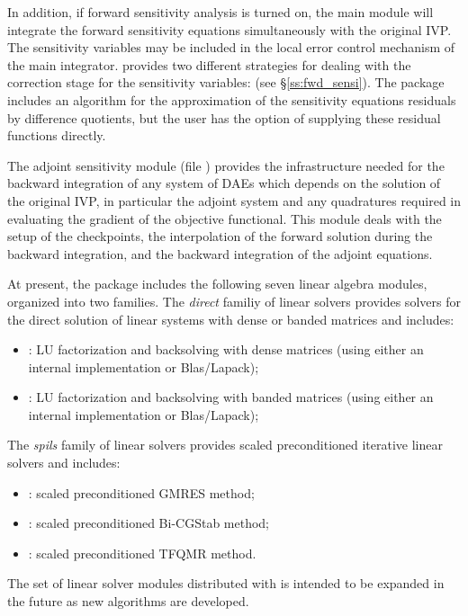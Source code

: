 In addition, if forward sensitivity analysis is turned on, the main module 
will integrate the forward sensitivity equations simultaneously with the original
IVP. The sensitivity variables may be included in the local error control
mechanism of the main integrator.
{\idas} provides two different strategies for dealing with the correction
stage for the sensitivity variables:  
(see \S\ref{ss:fwd_sensi}).
The {\idas} package includes an algorithm for the approximation of the
sensitivity equations residuals by difference quotients, but the user has
the option of supplying these residual functions directly.

The adjoint sensitivity module (file ) provides the infrastructure needed for the 
backward integration of any system of DAEs which depends on the solution 
of the original IVP, in particular the adjoint system and any quadratures required
in evaluating the gradient of the objective functional.  This module deals with
the setup of the checkpoints, the interpolation of the forward solution during
the backward integration, and the backward integration of the adjoint equations.

At present, the package includes the following seven {\idas} linear algebra
modules, organized into two families. The {\em direct} familiy of linear
solvers provides solvers for the direct solution of linear systems with
dense or banded matrices and includes:
\begin{itemize} 
\item {\idadense}: LU factorization and backsolving with dense matrices
  (using either an internal implementation or Blas/Lapack); 
\item {\idaband}: LU factorization and backsolving with banded matrices
  (using either an internal implementation or Blas/Lapack); 
\end{itemize}
The {\em spils} family of linear solvers provides scaled preconditioned
iterative linear solvers and includes:
\begin{itemize} 
\item {\idaspgmr}: scaled preconditioned GMRES method;
\item {\idaspbcg}: scaled preconditioned Bi-CGStab method;
\item {\idasptfqmr}: scaled preconditioned TFQMR method.
\end{itemize}
The set of linear solver modules distributed with {\idas} is intended to be expanded in the
future as new algorithms are developed.

